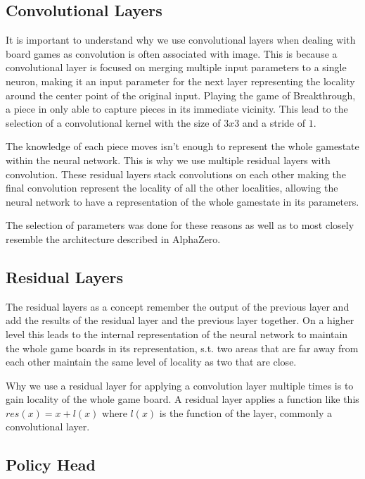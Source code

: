 \subsection{Convolutional Layers}

It is important to understand why we use convolutional layers when dealing with board games as convolution is often associated with image. This is because a convolutional layer is focused on merging multiple input parameters to a single neuron, making it an input parameter for the next layer representing the locality around the center point of the original input. Playing the game of Breakthrough, a piece in only able to capture pieces in its immediate vicinity. This lead to the selection of a convolutional kernel with the size of $3x3$ and a stride of $1$.

The knowledge of each piece moves isn't enough to represent the whole gamestate within the neural network. This is why we use multiple residual layers with convolution. These residual layers stack convolutions on each other making the final convolution represent the locality of all the other localities, allowing the neural network to have a representation of the whole gamestate in its parameters.

The selection of parameters was done for these reasons as well as to most closely resemble the architecture described in AlphaZero.

\subsection{Residual Layers}

The residual layers as a concept remember the output of the previous layer and add the results of the residual layer and the previous layer together. On a higher level this leads to the internal representation of the neural network to maintain the whole game boards in its representation, s.t. two areas that are far away from each other maintain the same level of locality as two that are close.

Why we use a residual layer for applying a convolution layer multiple times is to gain locality of the whole game board. A residual layer applies a function like this $res(x) = x + l(x)$ where $l(x)$ is the function of the layer, commonly a convolutional layer.

\subsection{Policy Head}

